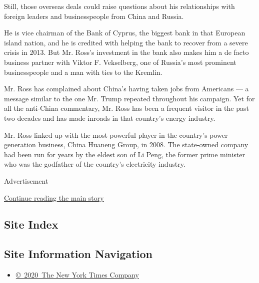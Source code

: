 Still, those overseas deals could raise questions about his
relationships with foreign leaders and businesspeople from China and
Russia.

He is vice chairman of the Bank of Cyprus, the biggest bank in that
European island nation, and he is credited with helping the bank to
recover from a severe crisis in 2013. But Mr. Ross's investment in the
bank also makes him a de facto business partner with Viktor F.
Vekselberg, one of Russia's most prominent businesspeople and a man with
ties to the Kremlin.

Mr. Ross has complained about China's having taken jobs from Americans
--- a message similar to the one Mr. Trump repeated throughout his
campaign. Yet for all the anti-China commentary, Mr. Ross has been a
frequent visitor in the past two decades and has made inroads in that
country's energy industry.

Mr. Ross linked up with the most powerful player in the country's power
generation business, China Huaneng Group, in 2008. The state-owned
company had been run for years by the eldest son of Li Peng, the former
prime minister who was the godfather of the country's electricity
industry.

Advertisement

\protect\hyperlink{after-bottom}{Continue reading the main story}

\hypertarget{site-index}{%
\subsection{Site Index}\label{site-index}}

\hypertarget{site-information-navigation}{%
\subsection{Site Information
Navigation}\label{site-information-navigation}}

\begin{itemize}
\tightlist
\item
  \href{https://help.nytimes3xbfgragh.onion/hc/en-us/articles/115014792127-Copyright-notice}{©~2020~The
  New York Times Company}
\end{itemize}

